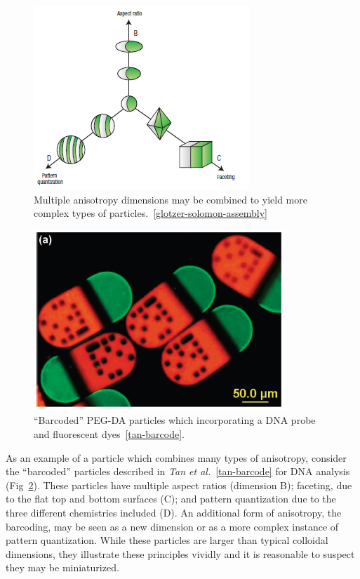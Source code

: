 \begin{figure}[h]
\begin{center}
\includegraphics{figures/glotzer-combine-dimensions.png}
\end{center}
\caption{Multiple anisotropy dimensions may be combined to yield more complex types of particles.~\ref{glotzer-solomon-assembly}}
\label{fig:dimensions-combined}
\end{figure}

\begin{figure}[h]
\begin{center}
\includegraphics{figures/tan-dna-barcode.png}
\end{center}
\caption{``Barcoded'' PEG-DA particles which incorporating a DNA probe and fluorescent dyes~\ref{tan-barcode}.}
\label{fig:tan-particles}
\end{figure}

As an example of a particle which combines many types of anisotropy, 
consider the ``barcoded'' particles described in \textit{Tan et al.}~\ref{tan-barcode} for DNA analysis (Fig~\ref{fig:tan-particles}).
These particles have multiple aspect ratios (dimension B); faceting, due to the flat top and bottom surfaces (C); and pattern
quantization due to the three different chemistries included (D).  An additional form of anisotropy, the barcoding, may be seen
as a new dimension or as a more complex instance of pattern quantization.  While these particles are larger than typical colloidal
dimensions, they illustrate these principles vividly and it is reasonable to suspect they may be miniaturized.

